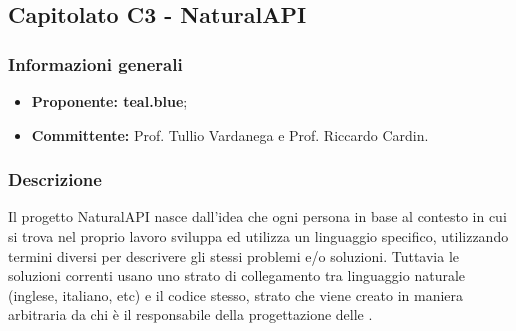 

    \subsection{Capitolato C3 - NaturalAPI}
       \subsubsection{Informazioni generali}
       \begin{itemize}
           \item \textbf{Proponente: teal.blue};
           \item \textbf{Committente: }Prof. Tullio Vardanega e Prof. Riccardo Cardin.
       \end{itemize}

    \subsubsection{Descrizione}
 		Il progetto NaturalAPI nasce dall'idea che ogni persona in base al contesto in cui si trova nel proprio lavoro sviluppa ed utilizza un linguaggio specifico, utilizzando termini diversi per descrivere gli stessi problemi e/o soluzioni. Tuttavia le soluzioni correnti usano uno strato di collegamento tra linguaggio naturale (inglese, italiano, etc) e il codice stesso, strato che viene creato in maniera arbitraria da chi è il responsabile della progettazione delle .
